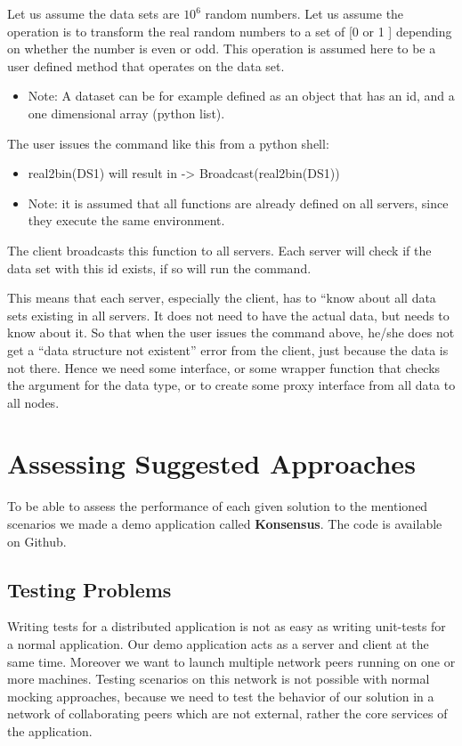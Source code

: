 Let us assume the data sets are \(10^6\) random numbers.
Let us assume the operation is to transform the real random numbers to a set of [0 or 1 ] depending on whether the number is even or odd. 
This operation is assumed here to be a user defined method that operates on the data set.

\begin{itemize}
\item Note: A dataset can be for example defined as an object that has an id, and a one dimensional array (python list).
\end{itemize}

The user issues the command like this from a python shell: 

\begin{itemize}
\item real2bin(DS1) will result in -> Broadcast(real2bin(DS1))
\item Note: it is assumed that all functions are already defined on all servers, since they execute the same environment.
\end{itemize}

The client broadcasts this function to all servers. Each server will check if the data set with this id exists, if so will run the command. 

This means that each server, especially the client, has to “know about all data sets existing in all servers.
It does not need to have the actual data, but needs to know about it. So that when the user issues the command
above, he/she does not get a “data structure not existent” error from the client, just because the data is not
there. Hence we need some interface, or some wrapper function that checks the argument for the data type, or to 
create some proxy interface from all data to all nodes. 

\section{Assessing Suggested Approaches}
To be able to assess the performance of each given solution to the mentioned scenarios we made a demo application
called \textbf{Konsensus}. The code is available on Github. %

\subsection{Testing Problems}
Writing tests for a distributed application is not as easy as writing unit-tests for a normal application. 
Our demo application acts as a server and client at the same time. Moreover we want to launch multiple 
network peers running on one or more machines. Testing scenarios on this network is not possible with
normal mocking approaches, because we need to test the behavior of our solution in a network of collaborating
peers which are not external, rather the core services of the application.

